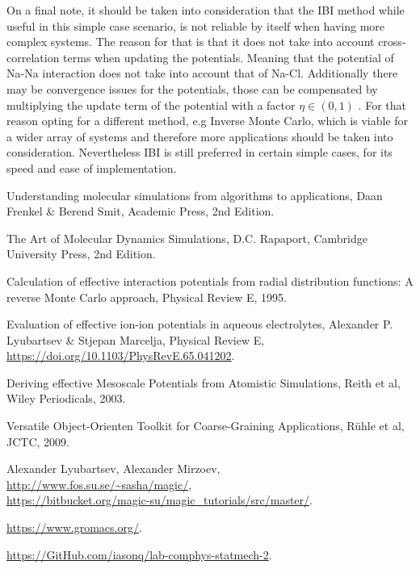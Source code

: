\documentclass[10pt]{article}
\begin{document}
    On a final note, it should be taken into consideration that the IBI method while useful in this simple case scenario, is not reliable by itself when having more complex systems. The reason for that is that it does not take into account cross-correlation terms when updating the potentials. Meaning that the potential of Na-Na interaction does not take into account that of Na-Cl. Additionally there may be convergence issues for the potentials, those can be compensated by multiplying the update term of the potential with a factor $\eta \in (0, 1)$ \cite{Ruhle}. For that reason opting for a different method, e.g Inverse Monte Carlo, which is viable for a wider array of systems and therefore more applications should be taken into consideration. Nevertheless IBI is still preferred in certain simple cases, for its speed and ease of implementation.

\begin{thebibliography}{9}

Understanding molecular simulations from algorithms to applications, Daan Frenkel \& Berend Smit, Academic Press, 2nd Edition.

The Art of Molecular Dynamics Simulations, D.C. Rapaport, Cambridge University Press, 2nd Edition.

Calculation of effective interaction potentials from radial distribution functions: A reverse Monte Carlo approach, Physical Review E, 1995.

Evaluation of effective ion-ion potentials in aqueous electrolytes, Alexander P. Lyubartsev \& Stjepan Marcelja, Physical Review E, \url{https://doi.org/10.1103/PhysRevE.65.041202}.

Deriving effective Mesoscale Potentials from Atomistic Simulations, Reith et al, Wiley Periodicals, 2003.

Versatile Object-Orienten Toolkit for Coarse-Graining Applications, Rühle et al, JCTC, 2009.

Alexander Lyubartsev,
Alexander Mirzoev, \\
\url{http://www.fos.su.se/~sasha/magic/}, \\
\url{https://bitbucket.org/magic-su/magic_tutorials/src/master/}.

\url{https://www.gromacs.org/}.

\url{https://GitHub.com/iasonq/lab-comphys-statmech-2}.

\end{thebibliography}
\end{document}
